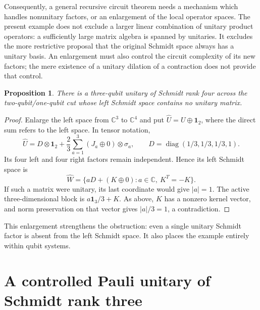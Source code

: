 \documentclass[11pt]{article}
\newtheorem{proposition}{Proposition}
\newcommand{\id}{\mathbf 1}
\begin{document}
Consequently, a general recursive circuit theorem needs a mechanism
which handles nonunitary factors, or an enlargement of the local
operator spaces. The present example does not exclude a larger linear
combination of unitary product operators: a sufficiently large matrix
algebra is spanned by unitaries. It excludes the more restrictive
proposal that the original Schmidt space always has a unitary basis.
An enlargement must also control the circuit complexity of its new
factors; the mere existence of a unitary dilation of a contraction
does not provide that control.

\begin{proposition}\label{prop:qubit}
There is a three-qubit unitary of Schmidt rank four across the
two-qubit/one-qubit cut whose left Schmidt space contains no unitary
matrix.
\end{proposition}
\begin{proof}
Enlarge the left space from $\mathbb C^3$ to $\mathbb C^4$ and put
$\widehat U=U\oplus\id_2$, where the direct sum refers to the left
space. In tensor notation,
\[
 \widehat U=D\otimes\id_2+
    \frac23\sum_{a=1}^3(J_a\oplus0)\otimes\sigma_a,
 \qquad D=\operatorname{diag}(1/3,1/3,1/3,1).
\]
Its four left and four right factors remain independent. Hence its
left Schmidt space is
\[
 \widehat W=\{aD+(K\oplus0):a\in\mathbb C,\ K^T=-K\}.
\]
If such a matrix were unitary, its last coordinate would give $|a|=1$.
The active three-dimensional block is $a\id_3/3+K$.
As above, $K$ has a nonzero kernel vector, and norm preservation on
that vector gives $|a|/3=1$, a contradiction.
\end{proof}

This enlargement strengthens the obstruction: even a single unitary
Schmidt factor is absent from the left Schmidt space. It also places
the example entirely within qubit systems.

\section{A controlled Pauli unitary of Schmidt rank three}
\end{document}
